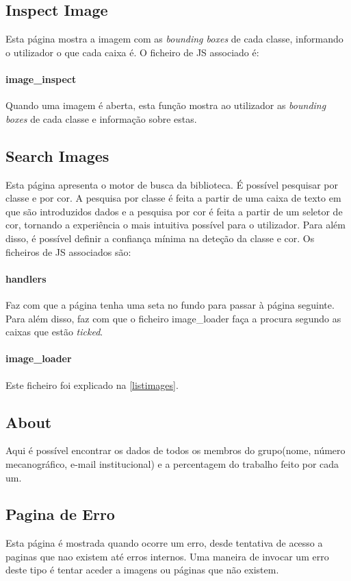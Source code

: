 \documentclass{report}
\begin{document}
\subsection{Inspect Image}
Esta página mostra a imagem  com as \textit{bounding boxes} de cada classe, informando o utilizador o que cada caixa é. O ficheiro de \ac{JS} associado é:
\paragraph{image\_inspect}
Quando uma imagem é aberta, esta função mostra ao utilizador as \textit{bounding boxes} de cada classe e informação sobre estas. 


\subsection{Search Images}
Esta página apresenta o motor de busca da biblioteca. É possível pesquisar por classe e por cor. 
A pesquisa por classe é feita a partir de uma caixa de texto em que são introduzidos dados e a pesquisa por cor é feita a partir de um seletor de cor, tornando a experiência o mais intuitiva possível para o utilizador. Para além disso, é possível definir a confiança mínima na deteção da classe e cor. Os ficheiros de \ac{JS} associados são:
\paragraph{handlers}
Faz com que a página tenha uma seta no fundo para passar à página seguinte. Para além disso, faz com que o ficheiro image\_loader faça a procura segundo as caixas que estão \textit{ticked}.
\paragraph{image\_loader}
Este ficheiro foi explicado na \autoref{listimages}.

\subsection{About}
Aqui é possível encontrar os dados de todos os membros do grupo(nome, número mecanográfico, e-mail institucional) e a percentagem do trabalho feito por cada um.

\subsection{Pagina de Erro}
Esta página é mostrada quando ocorre um erro, desde tentativa de acesso a paginas que nao existem até erros internos.
Uma maneira de invocar um erro deste tipo é tentar aceder a imagens ou páginas que não existem. 
\end{document}
